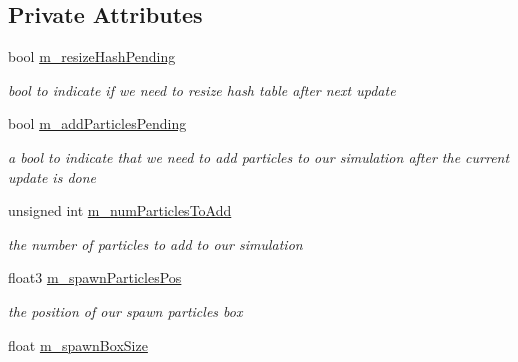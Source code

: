 \subsection*{Private Attributes}
\begin{DoxyCompactItemize}
\item 
\hypertarget{class_s_p_h_engine_a168c6bb74f1fcf56f9f48380746965c9}{bool \hyperlink{class_s_p_h_engine_a168c6bb74f1fcf56f9f48380746965c9}{m\-\_\-resize\-Hash\-Pending}}\label{class_s_p_h_engine_a168c6bb74f1fcf56f9f48380746965c9}

\begin{DoxyCompactList}\small\item\em bool to indicate if we need to resize hash table after next update \end{DoxyCompactList}\item 
\hypertarget{class_s_p_h_engine_a2fec14da52b66230e474b56ffcae354f}{bool \hyperlink{class_s_p_h_engine_a2fec14da52b66230e474b56ffcae354f}{m\-\_\-add\-Particles\-Pending}}\label{class_s_p_h_engine_a2fec14da52b66230e474b56ffcae354f}

\begin{DoxyCompactList}\small\item\em a bool to indicate that we need to add particles to our simulation after the current update is done \end{DoxyCompactList}\item 
\hypertarget{class_s_p_h_engine_a99cd34414259ac06e2c30e8e25507587}{unsigned int \hyperlink{class_s_p_h_engine_a99cd34414259ac06e2c30e8e25507587}{m\-\_\-num\-Particles\-To\-Add}}\label{class_s_p_h_engine_a99cd34414259ac06e2c30e8e25507587}

\begin{DoxyCompactList}\small\item\em the number of particles to add to our simulation \end{DoxyCompactList}\item 
\hypertarget{class_s_p_h_engine_a05089c0e43a8e7de62d6c9778d07a877}{float3 \hyperlink{class_s_p_h_engine_a05089c0e43a8e7de62d6c9778d07a877}{m\-\_\-spawn\-Particles\-Pos}}\label{class_s_p_h_engine_a05089c0e43a8e7de62d6c9778d07a877}

\begin{DoxyCompactList}\small\item\em the position of our spawn particles box \end{DoxyCompactList}\item 
\hypertarget{class_s_p_h_engine_a51899afcaa052f5d7c000a4c6f3bc6ac}{float \hyperlink{class_s_p_h_engine_a51899afcaa052f5d7c000a4c6f3bc6ac}{m\-\_\-spawn\-Box\-Size}}\label{class_s_p_h_engine_a51899afcaa052f5d7c000a4c6f3bc6ac}


\end{DoxyCompactItemize}
